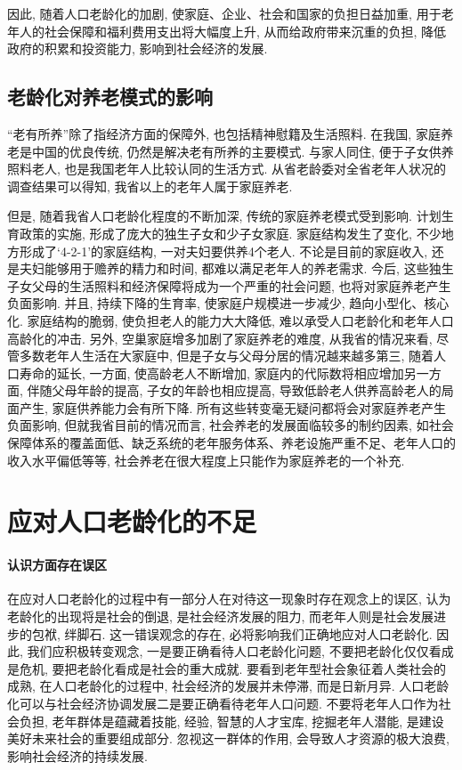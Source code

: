 \documentclass[a4paper, 12pt, UTF8]{article}
\begin{document}
因此, 随着人口老龄化的加剧, 使家庭、企业、社会和国家的负担日益加重, 用于老年人的社会保障和福利费用支出将大幅度上升, 从而给政府带来沉重的负担, 降低政府的积累和投资能力, 影响到社会经济的发展. 

\subsection{老龄化对养老模式的影响}
``老有所养''除了指经济方面的保障外, 也包括精神慰籍及生活照料. 在我国, 家庭养老是中国的优良传统, 仍然是解决老有所养的主要模式. 与家人同住, 便于子女供养照料老人, 也是我国老年人比较认同的生活方式. 从省老龄委对全省老年人状况的调查结果可以得知, 我省以上的老年人属于家庭养老.

但是, 随着我省人口老龄化程度的不断加深, 传统的家庭养老模式受到影响. 计划生育政策的实施, 形成了庞大的独生子女和少子女家庭. 家庭结构发生了变化, 不少地方形成了`4-2-1'的家庭结构, 一对夫妇要供养4个老人. 不论是目前的家庭收入, 还是夫妇能够用于赡养的精力和时间, 都难以满足老年人的养老需求. 今后, 这些独生子女父母的生活照料和经济保障将成为一个严重的社会问题, 也将对家庭养老产生负面影响. 并且, 持续下降的生育率, 使家庭户规模进一步减少, 趋向小型化、核心化. 家庭结构的脆弱, 使负担老人的能力大大降低, 难以承受人口老龄化和老年人口高龄化的冲击. 另外, 空巢家庭增多加剧了家庭养老的难度, 从我省的情况来看, 尽管多数老年人生活在大家庭中, 但是子女与父母分居的情况越来越多第三, 随着人口寿命的延长, 一方面, 使高龄老人不断增加, 家庭内的代际数将相应增加另一方面, 伴随父母年龄的提高, 子女的年龄也相应提高, 导致低龄老人供养高龄老人的局面产生, 家庭供养能力会有所下降. 所有这些转变毫无疑问都将会对家庭养老产生负面影响, 但就我省目前的情况而言, 社会养老的发展面临较多的制约因素, 如社会保障体系的覆盖面低、缺乏系统的老年服务体系、养老设施严重不足、老年人口的收入水平偏低等等, 社会养老在很大程度上只能作为家庭养老的一个补充. 

\section{应对人口老龄化的不足}
\paragraph{认识方面存在误区}
在应对人口老龄化的过程中有一部分人在对待这一现象时存在观念上的误区, 认为老龄化的出现将是社会的倒退, 是社会经济发展的阻力, 而老年人则是社会发展进步的包袱, 绊脚石. 这一错误观念的存在, 必将影响我们正确地应对人口老龄化. 因此, 我们应积极转变观念, 一是要正确看待人口老龄化问题, 不要把老龄化仅仅看成是危机, 要把老龄化看成是社会的重大成就. 要看到老年型社会象征着人类社会的成熟, 在人口老龄化的过程中, 社会经济的发展并未停滞, 而是日新月异. 人口老龄化可以与社会经济协调发展二是要正确看待老年人口问题. 不要将老年人口作为社会负担, 老年群体是蕴藏着技能, 经验, 智慧的人才宝库, 挖掘老年人潜能, 是建设美好未来社会的重要组成部分. 忽视这一群体的作用, 会导致人才资源的极大浪费, 影响社会经济的持续发展. 
\end{document}

